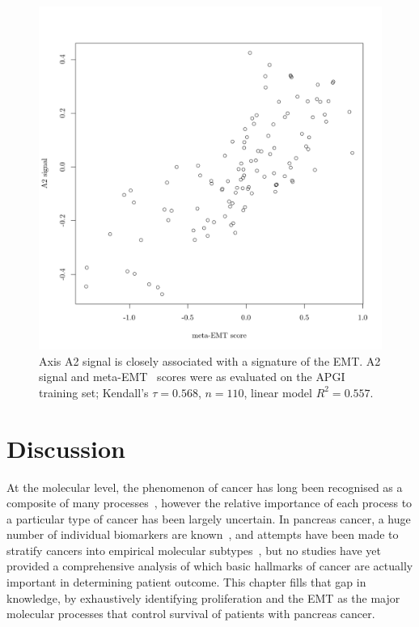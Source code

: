 \documentclass[dissertation.tex]{subfiles}
\begin{document}
\begin{figure}
\centering
\includegraphics[width=.7\linewidth]{analysis/biosurv/reports/18_SIS_diag_dsd_final/figure/nmf-msigdb-cor-plots-8}
\caption[A2 signal is closely associated with meta-EMT score]{Axis A2 signal is closely associated with a signature of the \gls{EMT}.  A2 signal and meta-EMT~\cite{Groger2012} scores were as evaluated on the \acrshort{APGI} training set; Kendall's $\tau = 0.568$, $n = 110$, linear model $R^2 = 0.557$.}\label{fig:sigs-axis2-emt}
\end{figure}

\section{Discussion}
At the molecular level, the phenomenon of cancer has long been recognised as a composite of many processes~\cite{Hanahan2011}, however the relative importance of each process to a particular type of cancer has been largely uncertain.  In pancreas cancer, a huge number of individual biomarkers are known~\cite{Harsha2009}, and attempts have been made to stratify cancers into empirical molecular subtypes~\cite{Collisson2011}, but no studies have yet provided a comprehensive analysis of which basic hallmarks of cancer are actually important in determining patient outcome.  This chapter fills that gap in knowledge, by exhaustively identifying proliferation and the \gls{EMT} as the major molecular processes that control survival of patients with pancreas cancer.

\end{document}
